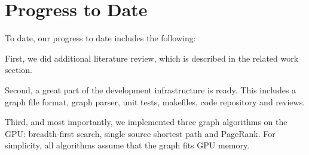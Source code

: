\documentclass{acm_proc_article-sp}[12pt]
\begin{document}
\section{Progress to Date}
\label{sec:progress}

To date, our progress to date includes the following:

First, we did additional literature review, which is described in the related work section.

Second, a great part of the development infrastructure is ready. This includes a graph file format, graph parser, unit tests, makefiles, code repository and reviews.

Third, and most importantly, we implemented three graph algorithms on the GPU: breadth-first search, single source shortest path and PageRank. For simplicity, all algorithms assume that the graph fits GPU memory. 



\end{document}
